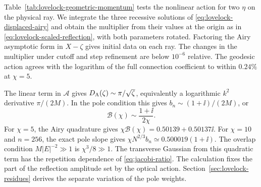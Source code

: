 Table~\ref{tab:lovelock-geometric-momentum} tests the nonlinear
action for two \(\eta\) on the physical ray. We integrate the
three recessive solutions of \eqref{eq:lovelock-displaced-airy}
and obtain the multiplier from their values at the origin as in
\eqref{eq:lovelock-scaled-reflection}, with both parameters rotated.
Factoring the Airy asymptotic form in \(X-\zeta\) gives initial
data on each ray. The changes in the multiplier under cutoff
and step refinement are below \(10^{-6}\) relative. The
geodesic action agrees with the logarithm of the full connection
coefficient to within \(0.24\%\) at \(\chi=5\).

The linear term in \(\mathcal A\) gives
\(D_{\rm A}(\zeta)\sim\pi/\sqrt\zeta\), equivalently a
logarithmic \(k^2\) derivative \(\pi/(2M)\). In the pole condition
this gives \(b_n\sim(1+\ii)/(2M)\), or
\begin{equation}
 \mathcal B(\chi)\sim\frac{1+\ii}{2\chi}.
 \label{eq:lovelock-massive-limit}
\end{equation}
For \(\chi=5\), the Airy quadrature gives
\(\chi\mathcal B(\chi)=0.50139+0.50137\ii\).
For \(\chi=10\) and \(n=256\), the exact pole slope gives
\(\chi N^{2/3}b_n\simeq0.500019(1+\ii)\).
The overlap condition \(M|E|^{-2}\gg1\) is \(\chi^3/8\gg1\).
The transverse Gaussian from this quadratic term has the
repetition dependence of \eqref{eq:jacobi-ratio}.
The calculation fixes the part of the reflection amplitude
set by the optical action. Section~\ref{sec:lovelock-residues}
derives the separate variation of the pole weights.
